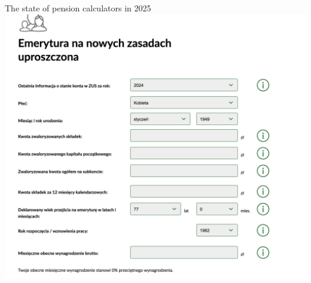 \begin{frame}[t]{The state of pension calculators in 2025}
\includegraphics[width=.8\textwidth]{img/zus_calculator_03}
\end{frame}
